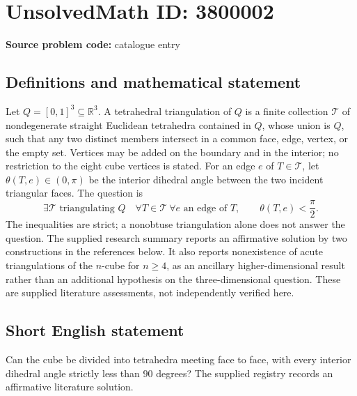 \documentclass[11pt]{article}
\newcommand{\R}{\mathbb{R}}
\begin{document}
\section*{UnsolvedMath ID: 3800002}
\textbf{Source problem code:} catalogue entry
\subsection{Definitions and mathematical statement}
Let \(Q=[0,1]^3\subseteq\R^3\). A tetrahedral triangulation of \(Q\) is a finite collection \(\mathcal T\) of nondegenerate straight Euclidean tetrahedra contained in \(Q\), whose union is \(Q\), such that any two distinct members intersect in a common face, edge, vertex, or the empty set. Vertices may be added on the boundary and in the interior; no restriction to the eight cube vertices is stated. For an edge \(e\) of \(T\in\mathcal T\), let \(\theta(T,e)\in(0,\pi)\) be the interior dihedral angle between the two incident triangular faces. The question is
\[
\exists\mathcal T\text{ triangulating }Q\quad
\forall T\in\mathcal T\ \forall e\text{ an edge of }T,\qquad
\theta(T,e)<\frac\pi2.
\]
The inequalities are strict; a nonobtuse triangulation alone does not answer the question. The supplied research summary reports an affirmative solution by two constructions in the references below. It also reports nonexistence of acute triangulations of the \(n\)-cube for \(n\ge4\), as an ancillary higher-dimensional result rather than an additional hypothesis on the three-dimensional question. These are supplied literature assessments, not independently verified here.
\subsection{Short English statement}
Can the cube be divided into tetrahedra meeting face to face, with every interior dihedral angle strictly less than \(90\) degrees? The supplied registry records an affirmative literature solution.
\end{document}
